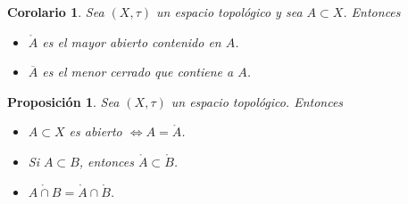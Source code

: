 \documentclass[12pt]{report}
\newtheorem{proposition}{Proposición}[chapter]
\newtheorem{corollary}{Corolario}[chapter]
\theoremstyle{definition}
\theoremstyle{definition}
\theoremstyle{remark}
\begin{document}
\begin{corollary}
\label{cor1.1.}
Sea $(X,\tau)$ un espacio topológico y sea $A \subset X$. Entonces
\begin{itemize}
    \item[(i)] $\mathring{A}$ es el mayor abierto contenido en $A$.
    \item[(ii)] $\overline{A}$ es el menor cerrado que contiene a $A$.
\end{itemize}
\end{corollary}

\begin{proposition}
Sea $(X,\tau)$ un espacio topológico. Entonces
\begin{itemize}
    \item[(i)] $A \subset X$ es abierto $\iff A = \mathring{A}$.
    \item[(ii)] Si $A \subset B$, entonces $\mathring{A} \subset \mathring{B}$.
    \item[(iii)] $\mathring{A \cap B} = \mathring{A} \cap \mathring{B}$.
\end{itemize}
\end{proposition}
\end{document}
